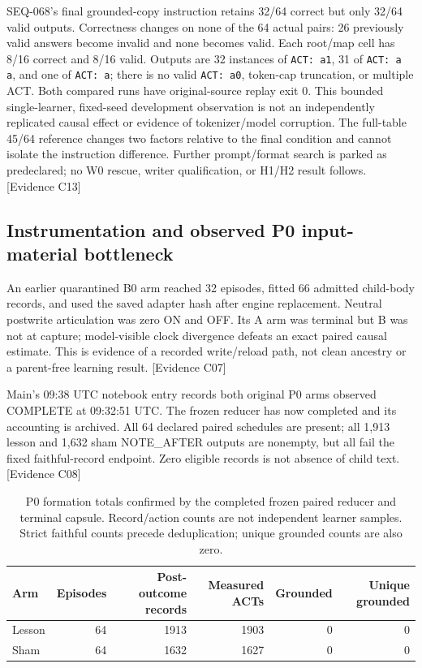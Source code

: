 \documentclass[11pt]{article}
\newcommand{\ev}[1]{\textsf{[Evidence #1]}}
\begin{document}
SEQ-068's final grounded-copy instruction retains 32/64 correct but only 32/64
valid outputs. Correctness changes on none of the 64 actual pairs: 26 previously
valid answers become invalid and none becomes valid. Each root/map cell has
8/16 correct and 8/16 valid. Outputs are 32 instances of \texttt{ACT: a1},
31 of \texttt{ACT: a a}, and one of \texttt{ACT: a}; there is no valid
\texttt{ACT: a0}, token-cap truncation, or multiple ACT. Both compared runs have
original-source replay exit 0. This bounded single-learner, fixed-seed development
observation is not an independently replicated causal effect or evidence of
tokenizer/model corruption. The full-table 45/64 reference changes two factors
relative to the final condition and cannot isolate the instruction difference.
Further prompt/format search is parked as predeclared; no W0 rescue, writer
qualification, or H1/H2 result follows. \ev{C13}

\subsection{Instrumentation and observed P0 input-material bottleneck}
An earlier quarantined B0 arm reached 32 episodes, fitted 66 admitted child-body
records, and used the saved adapter hash after engine replacement. Neutral
postwrite articulation was zero ON and OFF. Its A arm was terminal but B was not
at capture; model-visible clock divergence defeats an exact paired causal
estimate. This is evidence of a recorded write/reload path, not clean ancestry
or a parent-free learning result. \ev{C07}

Main's 09:38 UTC notebook entry records both original P0 arms observed COMPLETE
at 09:32:51 UTC. The frozen reducer has now completed and its accounting is
archived. All 64 declared paired schedules are present; all 1,913 lesson and
1,632 sham NOTE\_AFTER outputs are nonempty, but all fail the fixed faithful-record
endpoint. Zero eligible records is not absence of child text. \ev{C08}

\begin{table}[htbp]
\centering\small
\begin{tabular}{lrrrrr}
\toprule
Arm & Episodes & Post-outcome records & Measured ACTs & Grounded & Unique grounded \\
\midrule
Lesson & 64 & 1913 & 1903 & 0 & 0 \\
Sham & 64 & 1632 & 1627 & 0 & 0 \\
\bottomrule
\end{tabular}
\caption{P0 formation totals confirmed by the completed frozen paired reducer
and terminal capsule. Record/action counts are not independent learner samples.
Strict faithful counts precede deduplication; unique grounded counts are also zero.}
\label{tab:p0}
\end{table}
\end{document}
